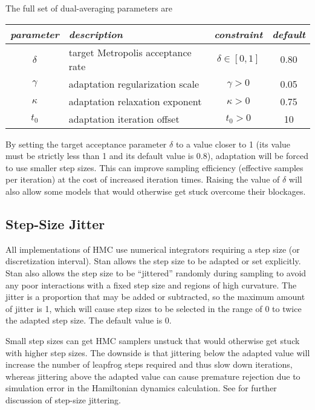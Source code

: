 The full set of dual-averaging parameters are
%
\begin{center}
\begin{tabular}{c|lcc}
{\it parameter} & {\it description} & {\it constraint} & {\it default}
\\ \hline
$\delta$ & target Metropolis acceptance rate 
         & $\delta \in [0,1]$ 
         & 0.80
\\
$\gamma$ & adaptation regularization scale
         & $\gamma > 0$
         & 0.05
\\
$\kappa$ & adaptation relaxation exponent
         & $\kappa > 0$
         & 0.75
\\
$t_0$    & adaptation iteration offset
         & $t_0 > 0$
         & 10
\end{tabular}
\end{center}
%
By setting the target acceptance parameter $\delta$ to a value closer
to 1 (its value must be strictly less than 1 and its default value is
0.8), adaptation will be forced to use smaller step sizes. This can
improve sampling efficiency (effective samples per iteration) at the
cost of increased iteration times. Raising the value of $\delta$ will
also allow some models that would otherwise get stuck overcome their
blockages.

\subsection{Step-Size Jitter}

All implementations of HMC use numerical integrators requiring a step
size (or discretization interval). Stan allows the step size to be
adapted or set explicitly. Stan also allows the step size to be
``jittered'' randomly during sampling to avoid any poor interactions
with a fixed step size and regions of high curvature. The jitter is a
proportion that may be added or subtracted, so the maximum amount of
jitter is 1, which will cause step sizes to be selected in the range
of 0 to twice the adapted step size.  The default value is 0.

Small step sizes can get HMC samplers unstuck that would otherwise get
stuck with higher step sizes. The downside is that jittering below the
adapted value will increase the number of leapfrog steps required and
thus slow down iterations, whereas jittering above the adapted value
can cause premature rejection due to simulation error in the
Hamiltonian dynamics calculation. See \citep{Neal:2011} for further
discussion of step-size jittering.


